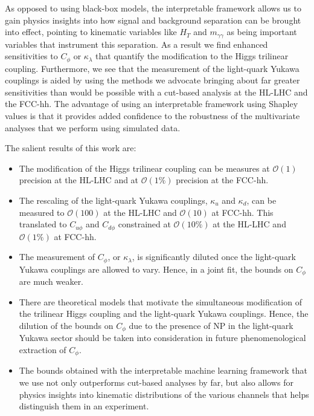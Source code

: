 As opposed to using black-box models, the interpretable framework allows us to gain physics insights into how signal and background separation can be brought into effect, pointing to kinematic variables like $H_T$ and $m_{\gamma\gamma}$ as being important variables that instrument this separation. As a result we find enhanced sensitivities to $C_\phi$ or $\kappa_\lambda$ that quantify the modification to the Higgs trilinear coupling. Furthermore, we see that the measurement of the light-quark Yukawa couplings is aided by using the methods we advocate bringing about far greater sensitivities than would be possible with a cut-based analysis at the HL-LHC and the FCC-hh. The advantage of using an interpretable framework using Shapley values is that it provides added confidence to the robustness of the multivariate analyses that we perform using simulated data.

The salient results of this work are:
\begin{itemize}
	\itemsep0em
	\item The modification of the Higgs trilinear coupling can be measures at $\mathcal{O}(1)$ precision at the HL-LHC and at $\mathcal{O}(1\%)$ precision at the FCC-hh. 
	\item The rescaling of the light-quark Yukawa couplings, $\kappa_u$ and $\kappa_d$, can be measured to $\mathcal{O}(100)$ at the HL-LHC and $\mathcal{O}(10)$ at FCC-hh. This translated to $C_{u\phi}$ and $C_{d\phi}$ constrained at $\mathcal{O}(10\%)$ at the HL-LHC and $\mathcal{O}(1\%)$ at FCC-hh.
	\item The measurement of $C_\phi$, or $\kappa_\lambda$, is significantly diluted once the light-quark Yukawa couplings are allowed to vary. Hence, in a joint fit, the bounds on $C_\phi$ are much weaker. 
	\item There are theoretical models that motivate the simultaneous modification of the trilinear Higgs coupling and the light-quark Yukawa couplings. Hence, the dilution of the bounds on $C_\phi$ due to the presence of NP in the light-quark Yukawa sector should be taken into consideration in future phenomenological extraction of $C_\phi$.
	\item The bounds obtained with the interpretable machine learning framework that we use not only outperforms cut-based analyses by far, but also allows for physics insights into kinematic distributions of the various channels that helps distinguish them in an experiment.
\end{itemize}

